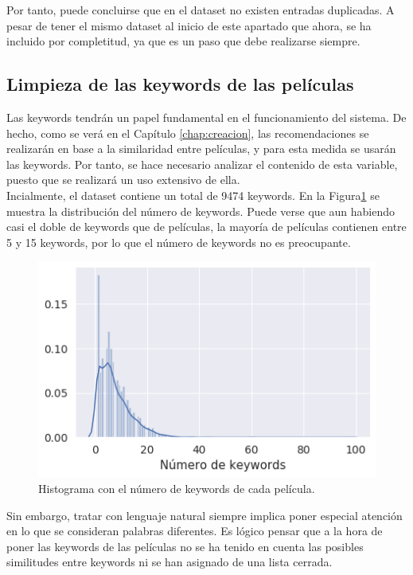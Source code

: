 Por tanto, puede concluirse que en el dataset no existen entradas duplicadas. A pesar de tener el mismo dataset al inicio de este apartado que ahora, se ha incluido por completitud, ya que es un paso que debe realizarse siempre.

\subsection{Limpieza de las keywords de las películas}

Las keywords tendrán un papel fundamental en el funcionamiento del sistema. De hecho, como se verá en el Capítulo \ref{chap:creacion}, las recomendaciones se realizarán en base a la similaridad entre películas, y para esta medida se usarán las keywords. Por tanto, se hace necesario analizar el contenido de esta variable, puesto que se realizará un uso extensivo de ella.\\

Incialmente, el dataset contiene un total de 9474 keywords. En la Figura\ref{fig:keywords_histogram} se muestra la distribución del número de keywords. Puede verse que aun habiendo casi el doble de keywords que de películas, la mayoría de películas contienen entre 5 y 15 keywords, por lo que el número de keywords no es preocupante.
\begin{figure}[H]
    \centering
    \captionsetup{width=10cm}
    \includegraphics[width=12cm]{contenido/imagenes/keyword_histogram.png}
    \caption{Histograma con el número de keywords de cada película.}
    \label{fig:keywords_histogram}
\end{figure}

Sin embargo, tratar con lenguaje natural siempre implica poner especial atención en lo que se consideran palabras diferentes. Es lógico pensar que a la hora de poner las keywords de las películas no se ha tenido en cuenta las posibles similitudes entre keywords ni se han asignado de una lista cerrada.\\

